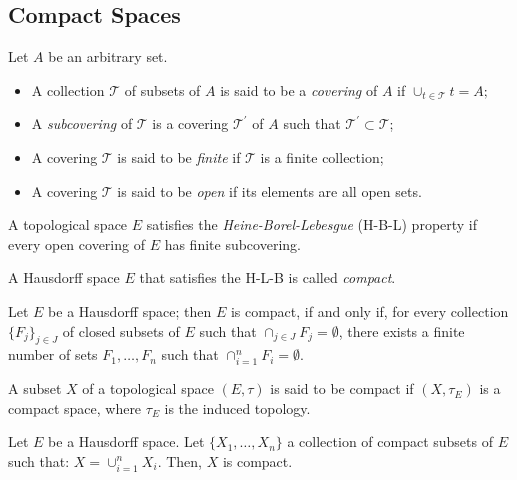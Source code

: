 \subsection{Compact Spaces}
\begin{definition}
	Let $A$ be an arbitrary set. 
	\begin{itemize}
		\item
			A collection $\mathcal{T}$ of subsets of $A$ is said to be a \emph{covering} of $A$ if $\cup_{t \in \mathcal{T}} t = A;$ 
		\item
			A \emph{subcovering} of $\mathcal{T}$ is a covering $\mathcal{T}^\prime$ of $A$ such that $\mathcal{T}^\prime \subset \mathcal{T}$;
		\item
			A covering $\mathcal{T}$ is said to be \emph{finite} if $\mathcal{T}$ is a finite collection;
		\item
			A covering $\mathcal{T}$ is said to be \emph{open} if its elements are all open sets.
	\end{itemize}
	\end{definition}

\begin{definition}
	A topological space $E$ satisfies the \emph{Heine-Borel-Lebesgue} (H-B-L) property if every open covering of $E$ has finite subcovering.
\end{definition}
\begin{definition}
A Hausdorff space $E$ that satisfies the H-L-B is called \emph{compact}.
\end{definition}

\begin{theorem}
	Let $E$ be a Hausdorff space; then $E$ is compact, if and only if, for every collection $\{F_j\}_{j \in J}$ of closed subsets of $E$ such that $\cap_{j \in J} F_j = \emptyset$, there exists a finite number of sets $F_1, \ldots, F_n$ such that $\cap_{i=1}^n F_i = \emptyset$.
\end{theorem}

\begin{definition}
	A subset $X$ of a topological space $(E, \tau)$ is said to be compact if $(X, \tau_E)$ is a compact space, where $\tau_E$ is the induced topology.
\end{definition}

\begin{theorem}
	Let $E$ be a Hausdorff space. Let $\{X_1, \ldots, X_n\}$ a collection of compact subsets of $E$ such that: $X = \cup_{i = 1}^n X_i$. Then, $X$ is compact.	
\end{theorem}

